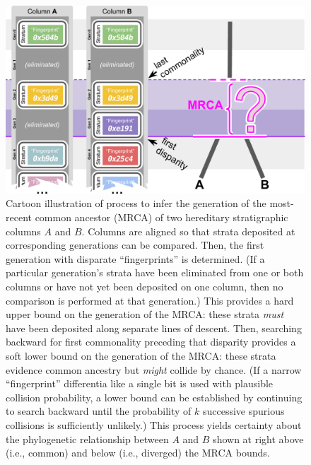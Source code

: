 \begin{figure}
    \includegraphics[width=\columnwidth]{img/column-comparison}
    \caption{
    Cartoon illustration of process to infer the generation of the most-recent common ancestor (MRCA) of two hereditary stratigraphic columns $A$ and $B$.
    Columns are aligned so that strata deposited at corresponding generations can be compared.
    Then, the first generation with disparate ``fingerprints'' is determined.
    (If a particular generation's strata have been eliminated from one or both columns or have not yet been deposited on one column, then no comparison is performed at that generation.)
    This provides a hard upper bound on the generation of the MRCA: these strata \textit{must} have been deposited along separate lines of descent.
    Then, searching backward for first commonality preceding that disparity provides a soft lower bound on the generation of the MRCA: these strata evidence common ancestry but \textit{might} collide by chance.
    (If a narrow ``fingerprint'' differentia like a single bit is used with plausible collision probability, a lower bound can be established by continuing to search backward until the probability of $k$ successive spurious collisions is sufficiently unlikely.)
    This process yields certainty about the phylogenetic relationship between $A$ and $B$ shown at right above (i.e., common) and below (i.e., diverged) the MRCA bounds.
    }
  \label{fig:column-comparison}
\end{figure}
